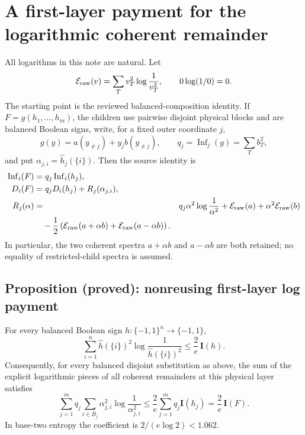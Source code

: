 \section*{A first-layer payment for the logarithmic coherent remainder}

All logarithms in this note are natural.  Let
\[
  \mathcal E_{\rm raw}(v)=\sum_T v_T^2\log\frac1{v_T^2},
  \qquad 0\log(1/0)=0.
\]
The starting point is the reviewed balanced-composition identity.  If
\(F=g(h_1,\ldots,h_m)\), the children use pairwise disjoint physical
blocks and are balanced Boolean signs, write, for a fixed outer coordinate
\(j\),
\[
   g(y)=a(y_{\ne j})+y_jb(y_{\ne j}),\qquad
   q_j=\operatorname{Inf}_j(g)=\sum_T b_T^2,
\]
and put \(\alpha_{j,i}=\widehat h_j(\{i\})\).  Then the source identity is
\begin{align*}
 \operatorname{Inf}_i(F)&=q_j\operatorname{Inf}_i(h_j),\\
 D_i(F)&=q_jD_i(h_j)+R_j(\alpha_{j,i}),\\
 R_j(\alpha)&={}&q_j\alpha^2\log\frac1{\alpha^2}
      +\mathcal E_{\rm raw}(a)+\alpha^2\mathcal E_{\rm raw}(b)\\
 &\quad-\frac12\left(\mathcal E_{\rm raw}(a+\alpha b)
                 +\mathcal E_{\rm raw}(a-\alpha b)\right).
\end{align*}
In particular, the two coherent spectra \(a+\alpha b\) and
\(a-\alpha b\) are both retained; no equality of restricted-child
spectra is assumed.

\subsection*{Proposition (proved): nonreusing first-layer log payment}

For every balanced Boolean sign \(h:\{-1,1\}^n\to\{-1,1\}\),
\[
 \sum_{i=1}^n \widehat h(\{i\})^2
       \log\frac1{\widehat h(\{i\})^2}
 \le \frac2e\,\mathbf I(h).
 \tag{1}
\]
Consequently, for every balanced disjoint substitution as above, the sum
of the explicit logarithmic pieces of all coherent remainders at this
physical layer satisfies
\[
 \sum_{j=1}^m q_j\sum_{i\in B_j}\alpha_{j,i}^2
       \log\frac1{\alpha_{j,i}^2}
 \le \frac2e\sum_{j=1}^m q_j\mathbf I(h_j)
 =\frac2e\,\mathbf I(F).
 \tag{2}
\]
In base-two entropy the coefficient is \(2/(e\log 2)<1.062\).


